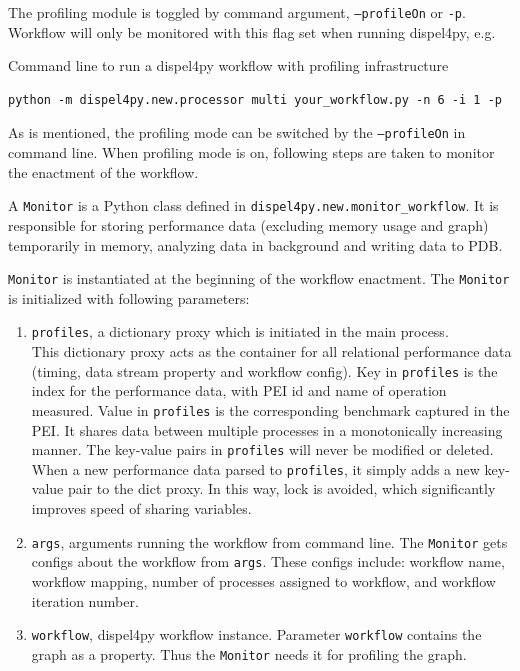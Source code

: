 \documentclass[10pt,twoside,openright,logo]{report}
\begin{document}
The profiling module is toggled by command argument, \texttt{--profileOn} or \texttt{-p}. Workflow will only be monitored with this flag set when running dispel4py, e.g.
\begin{listing}
\caption{Command line to run a dispel4py workflow with profiling infrastructure}
\label{code:cmdpf}
    \begin{verbatim}
python -m dispel4py.new.processor multi your_workflow.py -n 6 -i 1 -p
    \end{verbatim}
\end{listing}

As is mentioned, the profiling mode can be switched by the \texttt{--profileOn} in command line. When profiling mode is on, following steps are taken to monitor the enactment of the workflow.

A \texttt{Monitor} is a Python class defined in \texttt{dispel4py.new.monitor_workflow}. It is responsible for storing performance data (excluding memory usage and graph) temporarily in memory, analyzing data in background and writing data to PDB.

\texttt{Monitor} is instantiated at the beginning of the workflow enactment.
The \texttt{Monitor} is initialized with following parameters:
\begin{enumerate}
    \item \texttt{profiles}, a dictionary proxy which is initiated in the main process. \\
    This dictionary proxy acts as the container for all relational performance data (timing, data stream property and workflow config).
    Key in \texttt{profiles} is the index for the performance data, with PEI id and name of operation measured. Value in \texttt{profiles} is the corresponding benchmark captured in the PEI. It shares data between multiple processes in a monotonically increasing manner. The key-value pairs in \texttt{profiles} will never be modified or deleted. When a new performance data parsed to \texttt{profiles}, it simply adds a new key-value pair to the dict proxy. In this way, lock is avoided, which significantly improves speed of sharing variables.
    \item \texttt{args}, arguments running the workflow from command line. The \texttt{Monitor} gets configs about the workflow from \texttt{args}. These configs include: workflow name, workflow mapping, number of processes assigned to workflow, and workflow iteration number.
    \item \texttt{workflow}, dispel4py workflow instance. Parameter \texttt{workflow} contains the graph as a property. Thus the \texttt{Monitor} needs it for profiling the graph.
\end{enumerate}
\end{document}
